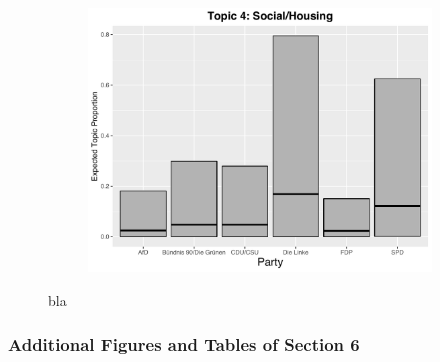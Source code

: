 \begin{figure}[h!]
\begin{subfigure}[b]{0.3\linewidth}
    \includegraphics[width=\linewidth]{../plots/appendix/5_1/direct_t4_cat.pdf}
  \end{subfigure}
  \caption{bla}
  \label{fig:coffee}
\end{figure}


\subsubsection*{Additional Figures and Tables of Section 6}

